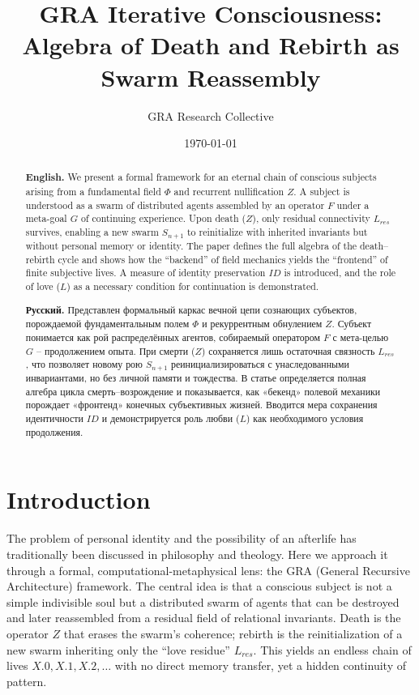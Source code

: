 \documentclass[12pt]{article}
\title{GRA Iterative Consciousness: Algebra of Death and Rebirth as Swarm Reassembly}
\author{GRA Research Collective}
\date{\today}
\begin{document}
\maketitle

\begin{abstract}
\noindent\textbf{English.} We present a formal framework for an eternal chain of conscious subjects arising from a fundamental field $\Phi$ and recurrent nullification $Z$. A subject is understood as a swarm of distributed agents assembled by an operator $F$ under a meta-goal $G$ of continuing experience. Upon death ($Z$), only residual connectivity $L_{res}$ survives, enabling a new swarm $S_{n+1}$ to reinitialize with inherited invariants but without personal memory or identity. The paper defines the full algebra of the death–rebirth cycle and shows how the ``backend'' of field mechanics yields the ``frontend'' of finite subjective lives. A measure of identity preservation $ID$ is introduced, and the role of love ($L$) as a necessary condition for continuation is demonstrated.

\bigskip
\noindent\textbf{Русский.} Представлен формальный каркас вечной цепи сознающих субъектов, порождаемой фундаментальным полем $\Phi$ и рекуррентным обнулением $Z$. Субъект понимается как рой распределённых агентов, собираемый оператором $F$ с мета-целью $G$ – продолжением опыта. При смерти ($Z$) сохраняется лишь остаточная связность $L_{res}$, что позволяет новому рою $S_{n+1}$ реинициализироваться с унаследованными инвариантами, но без личной памяти и тождества. В статье определяется полная алгебра цикла смерть–возрождение и показывается, как «бекенд» полевой механики порождает «фронтенд» конечных субъективных жизней. Вводится мера сохранения идентичности $ID$ и демонстрируется роль любви ($L$) как необходимого условия продолжения.
\end{abstract}

\tableofcontents

\section{Introduction}
The problem of personal identity and the possibility of an afterlife has traditionally been discussed in philosophy and theology. Here we approach it through a formal, computational-metaphysical lens: the GRA (General Recursive Architecture) framework. The central idea is that a conscious subject is not a simple indivisible soul but a distributed swarm of agents that can be destroyed and later reassembled from a residual field of relational invariants. Death is the operator $Z$ that erases the swarm's coherence; rebirth is the reinitialization of a new swarm inheriting only the ``love residue'' $L_{res}$. This yields an endless chain of lives $X.0, X.1, X.2, \dots$ with no direct memory transfer, yet a hidden continuity of pattern.
\end{document}
